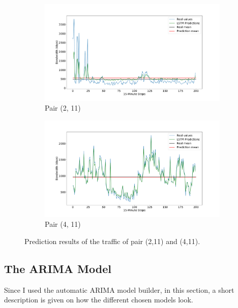\begin{figure}
	\centering
	\begin{subfigure}{1\linewidth}
		\centering
		\includegraphics[width=1\linewidth]{Pictures/Practical_Examples/LSTMprediction_1}
		\caption{Pair (2, 11)}
		\label{fig:LSTMprediction_01}
	\end{subfigure}
	\begin{subfigure}{1\linewidth}
		\centering
		\includegraphics[width=1\linewidth]{Pictures/Practical_Examples/LSTMprediction_3}
		\caption{Pair (4, 11)}
		\label{fig:LSTMprediction_03}
	\end{subfigure}
	\caption{Prediction results of the traffic of pair (2,11) and (4,11).}
	\label{fig:LSTMpredictions}
\end{figure}

\subsection{The ARIMA Model}
Since I used the automatic ARIMA model builder, in this section, a short description is given on how the different chosen models look.

